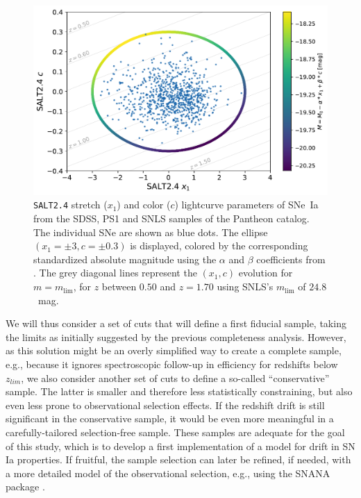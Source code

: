 \documentclass[]{aa}
\begin{document}
\begin{figure}
    \centering
    \includegraphics[width=0.95\linewidth]{Article_figures/zmax_maglim_snls.pdf}
    \caption{\textsc{\texttt{SALT2.4}} stretch ($x_1$) and color ($c$)
        lightcurve parameters of SNe~Ia from the SDSS, PS1 and SNLS samples of
        the Pantheon catalog. The individual SNe are shown as blue dots. The
        ellipse $(x_1=\pm3, c=\pm0.3)$ is displayed, colored by the
        corresponding standardized absolute magnitude using the $\alpha$ and
        $\beta$ coefficients from \cite{scolnic2018a}. The grey diagonal lines
        represent the $(x_1, c)$ evolution for $m = m_{\lim}$, for $z$ between
        $0.50$ and $z=1.70$ using SNLS's $m_{\lim}$ of $24.8$~mag.}
    \label{fig:maglim}
\end{figure}

We will thus consider a set of cuts that will define a first fiducial
    sample, taking the limits as initially suggested by the previous
    completeness analysis. However, as this solution might be an overly
    simplified way to create a complete sample, e.g., because it ignores
    spectroscopic follow-up in efficiency for redshifts below $z_{lim}$, we
    also consider another set of cuts to define a so-called ``conservative''
    sample. The latter is smaller and therefore less statistically constraining,
    but also even less prone to observational selection effects. If the redshift
    drift is still significant in the conservative sample, it would be even more
    meaningful in a carefully-tailored selection-free sample. These samples are
    adequate for the goal of this study, which is to develop a first
    implementation of a model for drift in SN Ia properties. If fruitful, the
    sample selection can later be refined, if needed, with a more detailed model
of the observational selection, e.g., using the SNANA package \citep{SNANA}.
\end{document}
